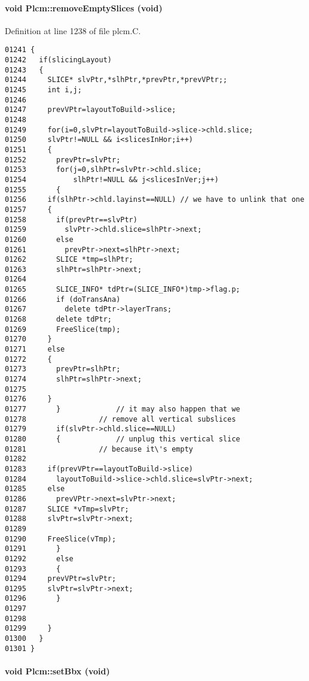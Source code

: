 \paragraph{\setlength{\rightskip}{0pt plus 5cm}void Plcm::remove\-Empty\-Slices (void)\hspace{0.3cm}{\tt  [private]}}\hfill



Definition at line 1238 of file plcm.C.\small\begin{verbatim}01241 {
01242   if(slicingLayout)
01243   {
01244     SLICE* slvPtr,*slhPtr,*prevPtr,*prevVPtr;;
01245     int i,j;
01246 
01247     prevVPtr=layoutToBuild->slice;
01248 
01249     for(i=0,slvPtr=layoutToBuild->slice->chld.slice;
01250     slvPtr!=NULL && i<slicesInHor;i++)
01251     {
01252       prevPtr=slvPtr;
01253       for(j=0,slhPtr=slvPtr->chld.slice;
01254           slhPtr!=NULL && j<slicesInVer;j++)
01255       {
01256     if(slhPtr->chld.layinst==NULL) // we have to unlink that one
01257     {
01258       if(prevPtr==slvPtr)
01259         slvPtr->chld.slice=slhPtr->next;
01260       else
01261         prevPtr->next=slhPtr->next;
01262       SLICE *tmp=slhPtr;
01263       slhPtr=slhPtr->next;
01264 
01265       SLICE_INFO* tdPtr=(SLICE_INFO*)tmp->flag.p;
01266       if (doTransAna)
01267         delete tdPtr->layerTrans;
01268       delete tdPtr;
01269       FreeSlice(tmp);
01270     }
01271     else
01272     {
01273       prevPtr=slhPtr;
01274       slhPtr=slhPtr->next;
01275 
01276     }
01277       }             // it may also happen that we
01278                 // remove all vertical subslices
01279       if(slvPtr->chld.slice==NULL)
01280       {             // unplug this vertical slice
01281                 // because it\'s empty
01282     
01283     if(prevVPtr==layoutToBuild->slice)
01284       layoutToBuild->slice->chld.slice=slvPtr->next;
01285     else
01286       prevVPtr->next=slvPtr->next;
01287     SLICE *vTmp=slvPtr;
01288     slvPtr=slvPtr->next;
01289     
01290     FreeSlice(vTmp);
01291       }
01292       else
01293       {
01294     prevVPtr=slvPtr;
01295     slvPtr=slvPtr->next;    
01296       }
01297 
01298 
01299     }
01300   }
01301 }
\end{verbatim}\normalsize 
\label{Plcm_a6}
\paragraph{\setlength{\rightskip}{0pt plus 5cm}void Plcm::set\-Bbx (void)}\hfill



